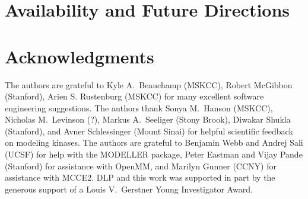 \documentclass[aps,pre,twocolumn,nofootinbib,superscriptaddress,linenumbers]{revtex4-1}
\begin{document}
\section{Availability and Future Directions}
\label{section:availability}

\section{Acknowledgments}
\label{section:acknowledgments}

The authors are grateful to Kyle A.~Beauchamp (MSKCC), Robert McGibbon (Stanford), Arien S. Rustenburg (MSKCC) for many excellent software engineering suggestions.
The authors thank Sonya M.~Hanson (MSKCC), Nicholas M.~Levinson (?), Markus A.~Seeliger (Stony Brook), Diwakar Shukla (Stanford), and Avner Schlessinger (Mount Sinai) for helpful scientific feedback on modeling kinases.
The authors are grateful to Benjamin Webb and Andrej Sali (UCSF) for help with the MODELLER package, Peter Eastman and Vijay Pande (Stanford) for assistance with OpenMM, and Marilyn Gunner (CCNY) for assistance with MCCE2.
DLP and this work was supported in part by the generous support of a Louis V.~Gerstner Young Investigator Award.


% 

\end{document}
